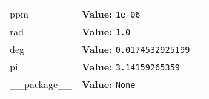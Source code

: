 \begin{longtable}{|p{\varnamewidth}|p{\vardescrwidth}|l}
\cline{1-2}
\raggedright p\-p\-m\- & \raggedright \textbf{Value:} 
{\tt 1e-06}&\\
\cline{1-2}
\raggedright r\-a\-d\- & \raggedright \textbf{Value:} 
{\tt 1.0}&\\
\cline{1-2}
\raggedright d\-e\-g\- & \raggedright \textbf{Value:} 
{\tt 0.0174532925199}&\\
\cline{1-2}
\raggedright p\-i\- & \raggedright \textbf{Value:} 
{\tt 3.14159265359}&\\
\cline{1-2}
\raggedright \_\-\_\-p\-a\-c\-k\-a\-g\-e\-\_\-\_\- & \raggedright \textbf{Value:} 
{\tt None}&\\
\cline{1-2}
\end{longtable}

